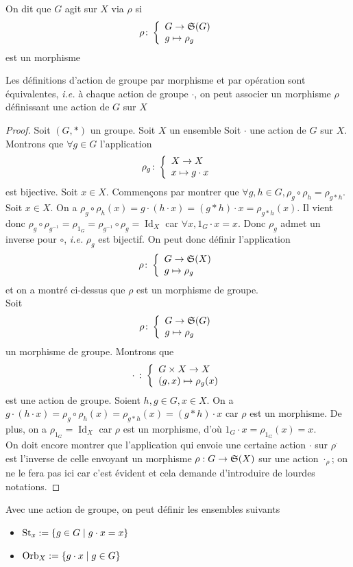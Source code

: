 \begin{definition}
    On dit que $G$ agit sur $X$ via $\rho$ si 
    \begin{equation*}
        \rho\colon \left\{\begin{array}{l}G\to\mathfrak{S}(G) \\g\mapsto \rho_g\end{array}\right.
    \end{equation*}
    est un morphisme
\end{definition}

\begin{proposition}
Les définitions d'action de groupe par morphisme et par opération sont équivalentes, \textit{i.e.} à chaque action de groupe $\cdot$, on peut associer un morphisme $\rho$ définissant une action de $G$ sur $X$
\end{proposition}

\begin{proof}
    Soit $(G,*)$ un groupe. Soit $X$ un ensemble
    Soit $\cdot$ une action de $G$ sur $X$. Montrons que $\forall g\in G$ l'application $$\rho_g\colon \left\{\begin{array}{l}X\to X \\x\mapsto g\cdot x\end{array}\right.$$ est bijective. Soit $x\in X$. Commençons par montrer que $\forall g,h\in G, \rho_g\circ\rho_h=\rho_{g*h}$. Soit $x\in X$. On a $\rho_g\circ\rho_h(x)=g\cdot(h\cdot x)=(g*h)\cdot x = \rho_{g*h}(x)$. Il vient donc $\rho_g\circ\rho_{g^{-1}} = \rho_{1_G} = \rho_{g^{-1}}\circ \rho_g = \operatorname{Id}_X$ car $\forall x, 1_G\cdot x = x$. Donc $\rho_g$ admet un inverse pour $\circ$, \textit{i.e.} $\rho_g$ est bijectif. On peut donc définir l'application $$\rho\colon \left\{\begin{array}{l}G\to\mathfrak{S}(X) \\g\mapsto\rho_g\end{array}\right.$$ et on a montré ci-dessus que $\rho$ est un morphisme de groupe.\\
    Soit $$\rho\colon \left\{\begin{array}{l}G\to\mathfrak{S}(G) \\g\mapsto\rho_g\end{array}\right.$$ un morphisme de groupe. Montrons que $$\cdot\ \colon \left\{\begin{array}{l}G\times X\to X \\(g,x)\mapsto \rho_g(x)\end{array}\right.$$ est une action de groupe. Soient $h,g\in G, x\in X$. On a $g\cdot(h\cdot x)=\rho_g\circ\rho_h(x)=\rho_{g*h}(x) = (g*h)\cdot x$ car $\rho$ est un morphisme. De plus, on a $\rho_{1_G} = \operatorname{Id}_X$ car $\rho$ est un morphisme, d'où $ 1_G\cdot x = \rho_{1_G}(x)=x$.\\
    On doit encore montrer que l'application qui envoie une certaine action $\cdot$ sur $\rho^\cdot$ est l'inverse de celle envoyant un morphisme $\rho:G\to\mathfrak{S}(X)$ sur une action $\cdot_\rho$; on ne le fera pas ici car c'est évident et cela demande d'introduire de lourdes notations.
\end{proof}

\begin{definition}
    Avec une action de groupe, on peut définir les ensembles suivants
    \begin{itemize}
    \item $\operatorname{St}_x:=\{g\in G\mid g\cdot x = x\}$
    \item $\operatorname{Orb}_X:=\{g\cdot x\mid g\in G\}$
    \end{itemize}
\end{definition}


